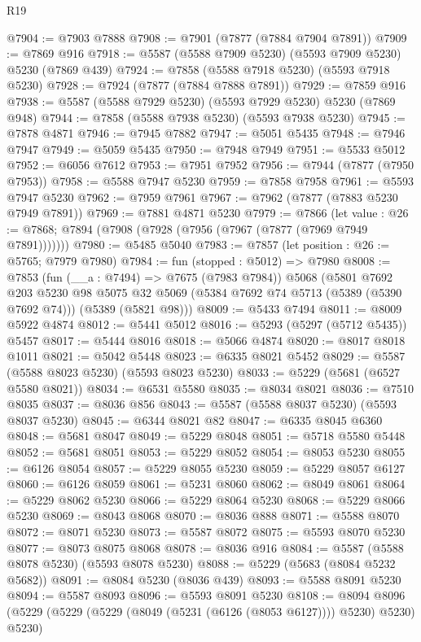 \begin{lexlean}{R19}
\begin{coremodule}
@7904 := @7903 @7888
@7908 := @7901 (@7877 (@7884 @7904 @7891))
@7909 := @7869 @916
@7918 := @5587 (@5588 @7909 @5230) (@5593 @7909 @5230) @5230 (@7869 @439)
@7924 := @7858 (@5588 @7918 @5230) (@5593 @7918 @5230)
@7928 := @7924 (@7877 (@7884 @7888 @7891))
@7929 := @7859 @916
@7938 := @5587 (@5588 @7929 @5230) (@5593 @7929 @5230) @5230 (@7869 @948)
@7944 := @7858 (@5588 @7938 @5230) (@5593 @7938 @5230)
@7945 := @7878 @4871
@7946 := @7945 @7882
@7947 := @5051 @5435
@7948 := @7946 @7947
@7949 := @5059 @5435
@7950 := @7948 @7949
@7951 := @5533 @5012
@7952 := @6056 @7612
@7953 := @7951 @7952
@7956 := @7944 (@7877 (@7950 @7953))
@7958 := @5588 @7947 @5230
@7959 := @7858 @7958
@7961 := @5593 @7947 @5230
@7962 := @7959 @7961
@7967 := @7962 (@7877 (@7883 @5230 @7949 @7891))
@7969 := @7881 @4871 @5230
@7979 := @7866
    (let value : @26 := @7868; @7894 (@7908 (@7928 (@7956 (@7967 (@7877 (@7969 @7949 @7891)))))))
@7980 := @5485 @5040
@7983 := @7857 (let position : @26 := @5765; @7979 @7980)
@7984 := fun (stopped : @5012) => @7980
@8008 := @7853
    (fun (__a : @7494) => @7675 (@7983 @7984))
    @5068
    (@5801
      @7692
      @203
      @5230
      @98
      @5075
      @32
      @5069
      (@5384 @7692 @74 @5713 (@5389 (@5390 @7692 @74)))
      (@5389 (@5821 @98)))
@8009 := @5433 @7494
@8011 := @8009 @5922 @4874
@8012 := @5441 @5012
@8016 := @5293 (@5297 (@5712 @5435)) @5457
@8017 := @5444 @8016
@8018 := @5066 @4874
@8020 := @8017 @8018 @1011
@8021 := @5042 @5448
@8023 := @6335 @8021 @5452
@8029 := @5587 (@5588 @8023 @5230) (@5593 @8023 @5230)
@8033 := @5229 (@5681 (@6527 @5580 @8021))
@8034 := @6531 @5580
@8035 := @8034 @8021
@8036 := @7510 @8035
@8037 := @8036 @856
@8043 := @5587 (@5588 @8037 @5230) (@5593 @8037 @5230)
@8045 := @6344 @8021 @82
@8047 := @6335 @8045 @6360
@8048 := @5681 @8047
@8049 := @5229 @8048
@8051 := @5718 @5580 @5448
@8052 := @5681 @8051
@8053 := @5229 @8052
@8054 := @8053 @5230
@8055 := @6126 @8054
@8057 := @5229 @8055 @5230
@8059 := @5229 @8057 @6127
@8060 := @6126 @8059
@8061 := @5231 @8060
@8062 := @8049 @8061
@8064 := @5229 @8062 @5230
@8066 := @5229 @8064 @5230
@8068 := @5229 @8066 @5230
@8069 := @8043 @8068
@8070 := @8036 @888
@8071 := @5588 @8070
@8072 := @8071 @5230
@8073 := @5587 @8072
@8075 := @5593 @8070 @5230
@8077 := @8073 @8075 @8068
@8078 := @8036 @916
@8084 := @5587 (@5588 @8078 @5230) (@5593 @8078 @5230)
@8088 := @5229 (@5683 (@8084 @5232 @5682))
@8091 := @8084 @5230 (@8036 @439)
@8093 := @5588 @8091 @5230
@8094 := @5587 @8093
@8096 := @5593 @8091 @5230
@8108 := @8094 @8096 (@5229 (@5229 (@5229 (@8049 (@5231 (@6126 (@8053 @6127)))) @5230) @5230) @5230)

\end{coremodule}
\end{lexlean}

